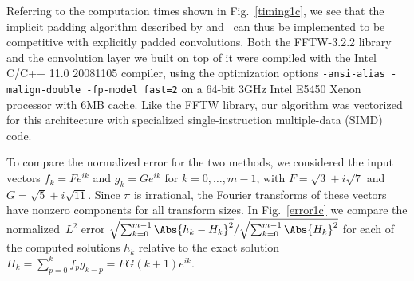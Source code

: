 \documentclass[final]{siamltex}
\begin{document}
Referring to the computation times shown in Fig.~\ref{timing1c},
we see that the implicit padding algorithm described by  
and~
can thus be implemented to be competitive with explicitly padded
convolutions. Both the FFTW-3.2.2 library and the convolution layer we built on
top of it were compiled with the Intel C/C++ 11.0 20081105 compiler, using
the optimization options {\tt -ansi-alias -malign-double -fp-model fast=2}
on a 64-bit 3GHz Intel E5450 Xenon processor with 6MB cache. Like the FFTW
library, our algorithm was vectorized for this architecture with
specialized single-instruction multiple-data (SIMD) code.

To compare the normalized error for the two methods, we considered the
input vectors $f_k=F e^{ik}$ and $g_k=G e^{ik}$ for $k=0,\ldots,m-1$,
with $F=\sqrt3+ i\sqrt 7$ and $G=\sqrt5+ i\sqrt {11}$.
Since $\pi$ is irrational, the Fourier transforms of these vectors have
nonzero components for all transform sizes.
In Fig.~\ref{error1c} we compare the normalized~$L^2$ error 
$\sqrt{\sum_{k=0}^{m-1}\Abs{h_k-H_k}^2}/\sqrt{\sum_{k=0}^{m-1} \Abs{H_k}^2}$
for each of the computed solutions $h_k$ relative to the exact solution 
$H_k=\sum_{p=0}^k f_p g_{k-p}=FG (k+1) e^{ik}$.

\SetProcFnt{\textnormal}
\setlength{\algomargin}{0.6em}
\SetAlCapSkip{3pt}
\def\ProcNameFnt{\tt}

\def\fft{{\tt fft}}
\def\crfft{{\tt crfft}}
\def\rcfft{{\tt rcfft}}
\def\cconv{{\tt cconv}}
\def\conv{{\tt conv}}
\def\biconv{{\tt biconv}}
\def\build{{\tt build}}
\def\fftpadBackwards{{\tt fftpadBackwards}}
\def\fftpadForwards{{\tt fftpadForwards}}
\def\fftOpadBackwards{{\tt fft0padBackwards}}
\def\fftOpadForwards{{\tt fft0padForwards}}
\def\fftbipadBackwards{{\tt fftbipadBackwards}}
\def\fftbipadForwards{{\tt fftbipadForwards}}
\def\fftObipadBackwards{{\tt fft0bipadBackwards}}
\def\fftObipadForwards{{\tt fft0bipadForwards}}
\end{document}
